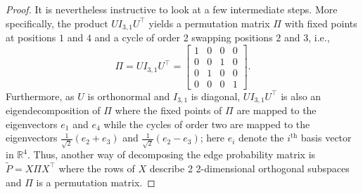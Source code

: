 \documentclass[12pt]{article}
\begin{document}
\begin{proof}
It is nevertheless instructive to look at a few intermediate steps. 
More specifically, the product $U I_{3, 1} U^\top$ 
yields a permutation matrix $\Pi$ with fixed points at positions $1$ and $4$ 
and a cycle of order 2 swapping positions $2$ and $3$, i.e., 
$$\Pi = U I_{3, 1} U^\top = \begin{bmatrix} 1 & 0 & 0 & 0 \\
  0 & 0 & 1 & 0 \\
  0 & 1 & 0 & 0 \\
  0 & 0 & 0 & 1
\end{bmatrix}.$$
Furthermore, as $U$ is orthonormal and $I_{3, 1}$ is diagonal, 
$U I_{3, 1} U^\top$ is also an eigendecomposition of $\Pi$ where the fixed
points of $\Pi$ are mapped to the eigenvectors $e_1$ and $e_4$
while the cycles of order two are mapped to the eigenvectors  
$\tfrac{1}{\sqrt{2}}(e_{2} + e_3)$ and $\tfrac{1}{\sqrt{2}}(e_{2} -
e_3)$; here $e_i$ denote the $i^\mathrm{th}$ basis vector in $\mathbb{R}^{4}$. 
Thus, another way of decomposing the edge probability matrix is $\tilde{P} = X \Pi X^\top$ where the rows of $X$ describe 2 2-dimensional orthogonal subspaces and $\Pi$ is a permutation matrix. 


\end{proof}
\end{document}
